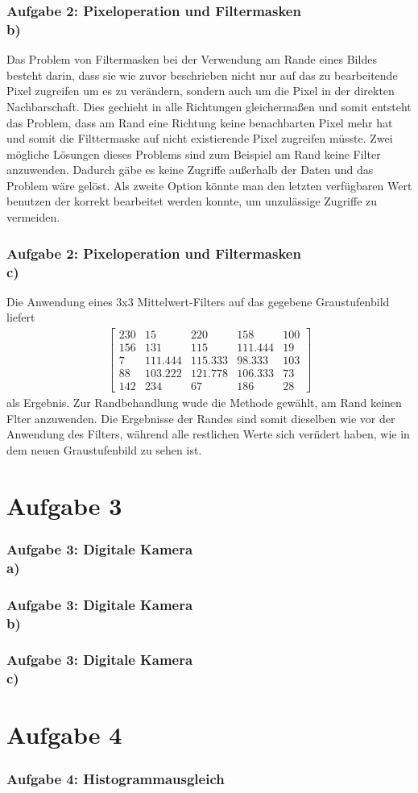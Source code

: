 \documentclass[accentcolor=tud9c,colorbacktitle,inverttitle,landscape,german,presentation,t]{tudbeamer}
\begin{document}
	\begin{frame}
		\frametitle{Aufgabe 2: Pixeloperation und Filtermasken \\ b)}
		Das Problem von Filtermasken bei der Verwendung am Rande eines Bildes besteht darin, dass sie wie zuvor beschrieben nicht nur auf das zu bearbeitende Pixel zugreifen um es  zu ver\"andern, sondern auch um die Pixel in der direkten Nachbarschaft. Dies gechieht in alle Richtungen gleicherma\ss en und somit entsteht das Problem, dass am Rand eine Richtung keine benachbarten Pixel mehr hat und somit die Filttermaske auf nicht existierende Pixel zugreifen m\"usste. Zwei m\"ogliche L\"osungen dieses Problems sind zum Beispiel am Rand keine Filter anzuwenden. Dadurch g\"abe es keine Zugriffe au\ss erhalb der Daten und das Problem w\"are gel\"ost. Als zweite Option k\"onnte man den letzten verf\"ugbaren Wert benutzen der korrekt bearbeitet werden konnte, um unzul\"assige Zugriffe zu vermeiden. 
	\end{frame}
	
	\begin{frame}
		\frametitle{Aufgabe 2: Pixeloperation und Filtermasken \\ c)}
	
		Die Anwendung eines 3x3 Mittelwert-Filters auf das gegebene Graustufenbild liefert
		\begin{align*}
		\begin{bmatrix}
		230 & 15 & 220 & 158 & 100 \\
		156 & 131 & 115 & 111.444 & 19\\
		7 & 111.444 & 115.333 & 98.333 & 103\\
		88 & 103.222 & 121.778 & 106.333 & 73\\
		142 &234 & 67 & 186 & 28
		\end{bmatrix}
		\end{align*}
		als Ergebnis. Zur Randbehandlung wude die Methode gew\"ahlt, am Rand keinen Flter anzuwenden. Die Ergebnisse der Randes sind somit dieselben wie vor der Anwendung des Filters, w\"ahrend alle restlichen Werte sich ver\"ndert haben, wie in dem neuen Graustufenbild zu sehen ist.
	\end{frame}

\section{Aufgabe 3}
	\begin{frame}
		\frametitle{Aufgabe 3: Digitale Kamera \\ a)}
	\end{frame}
	
	\begin{frame}
		\frametitle{Aufgabe 3: Digitale Kamera \\ b)}
	\end{frame}
	
	\begin{frame}
		\frametitle{Aufgabe 3: Digitale Kamera \\ c)}
	\end{frame}
\section{Aufgabe 4}
	\begin{frame}[t]
		\frametitle{Aufgabe 4: Histogrammausgleich}
	\end{frame}
\end{document}
